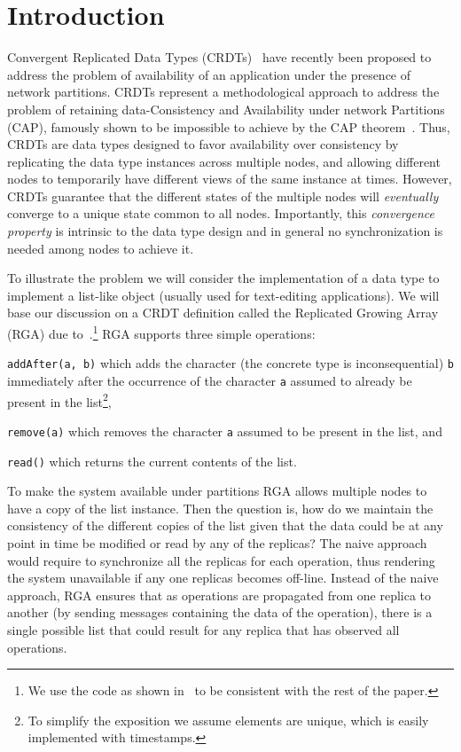 \section{Introduction}
\label{sec:introduction}

Convergent Replicated Data Types (CRDTs)~\cite{ShapiroPBZ11} have
recently been proposed to address the problem of availability of an
application under the presence of network partitions.
%
CRDTs represent a methodological approach to address the problem of
retaining data-Consistency and Availability under network Partitions (CAP),
famously shown to be impossible to achieve by the CAP
theorem~\cite{GilbertL02}.
%
Thus, CRDTs are data types designed to favor availability over
consistency by replicating the data type instances across multiple
nodes, and allowing different nodes to temporarily have different
views of the same instance at times.
%
However, CRDTs guarantee that the different states of the multiple
nodes will \emph{eventually} converge to a unique state common to all
nodes.
%
Importantly, this \emph{convergence property} is intrinsic to the data
type design and in general no synchronization is needed among nodes to
achieve it.

To illustrate the problem we will consider the implementation of a
data type to implement a list-like object (usually used for
text-editing applications).
%
We will base our discussion on a CRDT definition called the Replicated
Growing Array (RGA) due to~\cite{RohJKL11}.\footnote{We use the code
  as shown in~\cite{ShapiroPBZ11} to be consistent with the rest of
  the paper.}
%
RGA supports three simple operations:
\begin{inparaenum}
\item \lstinline|addAfter(a, b)| which adds the character (the
  concrete type is inconsequential)
  \lstinline|b| immediately after the occurrence of the character
  \lstinline|a| assumed to already be present in the list\footnote{To
    simplify the exposition we assume elements are unique, which is easily
    implemented with timestamps.},
\item \lstinline|remove(a)| which removes the character \lstinline|a|
  assumed to be present in the list, and
\item \lstinline|read()| which returns the current contents of the
  list.
\end{inparaenum}

To make the system available under partitions RGA allows multiple
nodes to have a copy of the list instance.
%
Then the question is, how do we maintain the consistency of the
different copies of the list given that the data could be at any point
in time be modified or read by any of the replicas?
%
The naive approach would require to synchronize all the replicas for
each operation, thus rendering the system unavailable if any one
replicas becomes off-line.
%
{
Instead of the naive approach, RGA ensures that as operations are
propagated from one replica to another (by sending messages containing
the data of the operation), there is a single possible list that could
result for any replica that has observed all operations.
}


